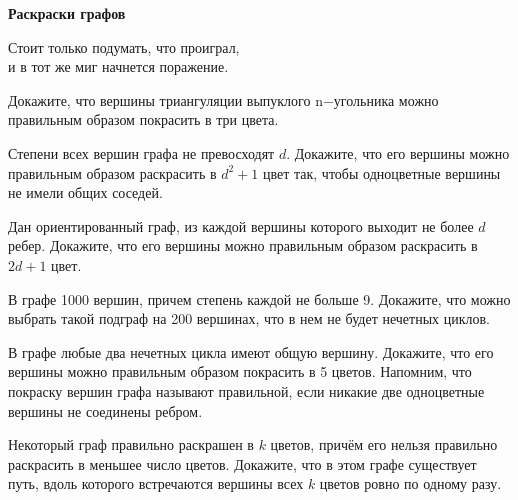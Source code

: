 \centerline{\bf \Huge Раскраски графов}

\begin{flushright}
        \scriptsize{Стоит только подумать, что проиграл, \\
                    и в тот же миг начнется поражение.}
\end{flushright}

Докажите, что вершины триангуляции выпуклого n$-$угольника можно правильным образом покрасить в три цвета.

Степени всех вершин графа не превосходят $d$. Докажите, что его вершины можно правильным образом раскрасить в $d^2+1$ цвет так, чтобы одноцветные вершины не имели общих соседей.

Дан ориентированный граф, из каждой вершины которого выходит не более $d$ ребер. Докажите, что его вершины можно правильным образом раскрасить в $2 d+1$ цвет.

В графе 1000 вершин, причем степень каждой не больше 9. Докажите, что можно выбрать такой подграф на 200 вершинах, что в нем не будет нечетных циклов.

В графе любые два нечетных цикла имеют общую вершину. Докажите, что его вершины можно правильным образом покрасить в 5 цветов. Напомним, что покраску вершин графа называют правильной, если никакие две одноцветные вершины не соединены ребром.

Некоторый граф правильно раскрашен в $k$ цветов, причём его нельзя правильно раскрасить в меньшее число цветов. Докажите, что в этом графе существует путь, вдоль которого встречаются вершины всех $k$ цветов ровно по одному разу.
